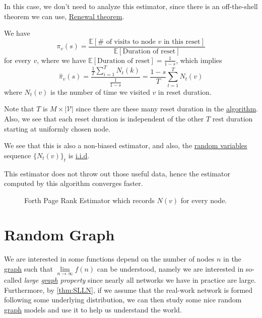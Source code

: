 In this case, we don't need to analyze this estimator, since there is an off-the-shell theorem we can use, \href{https://en.wikipedia.org/wiki/Renewal_theory}{Renewal theorem}.
\begin{theorem}\label{thm:Renewal-theorem}
	We have
	\[
		\pi_v(s) = \frac{\mathbb{E}\left[\# \text{ of visits to node \(v\) in this reset} \right]}{\mathbb{E}\left[\text{Duration of reset} \right] }
	\]
	for every \(v\), where we have \(\mathbb{E}\left[\text{Duration of reset} \right] =\frac{1}{1-s}\), which implies
	\[
		\hat{\pi}_v(s) = \frac{\frac{1}{T}\sum_{i=1}^{T} N_t(k)}{\frac{1}{1-s}} = \frac{1-s}{T}\sum\limits_{t=1}^{T} N_t(v)
	\]
	where \(N_t(v)\) is the number of time we visited \(v\) in reset duration.
\end{theorem}
\begin{note}
	Note that \(T\) is \(M\times \left\vert \mathcal{V}  \right\vert \) since there are these many reset duration in the \hyperref[algo:Monte-Carlo-algorithm-4]{algorithm}. Also, we see that each reset duration is independent of the other \(T\) rest duration starting at uniformly chosen node.
\end{note}

We see that this is also a non-biased estimator, and also, the \hyperref[def:random-variable]{random variables} sequence \(\{N_t(v)\}_t\) is \hyperref[def:i.i.d.]{i.i.d}.

\begin{remark}
	This estimator does not throw out those useful data, hence the estimator computed by this algorithm converges faster.
\end{remark}

\begin{figure}[H]
	\centering
	\caption{Forth Page Rank Estimator which records \(N(v)\) for every node.}
	\label{fig:Monte-Carlo-Estimator-4}
\end{figure}

\chapter{Random Graph}
We are interested in some functions depend on the number of nodes \(n\) in the \hyperref[def:graph]{graph} such that \(\lim\limits_{n\to \infty }f(n)\) can be understood, namely we are interested in so-called \emph{large \hyperref[def:graph]{graph} property} since nearly all networks we have in practice are large. Furthermore, by \autoref{thm:SLLN}, if we assume that the real-work network is formed following some underlying distribution, we can then study some nice random \hyperref[def:graph]{graph} models and use it to help us understand the world.


